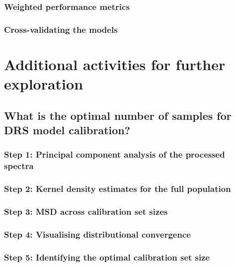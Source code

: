 \documentclass[
  10pt,
  b5paper,
  oneside]{book}
\begin{document}
\subsubsection{Weighted performance metrics}\label{weighted-performance-metrics}

\subsubsection{Cross-validating the models}\label{cross-validating-the-models}

\section{Additional activities for further exploration}\label{additional-activities-for-further-exploration}

\subsection{What is the optimal number of samples for DRS model calibration?}\label{what-is-the-optimal-number-of-samples-for-drs-model-calibration}

\subsubsection{Step 1: Principal component analysis of the processed spectra}\label{step-1-principal-component-analysis-of-the-processed-spectra}

\subsubsection{Step 2: Kernel density estimates for the full population}\label{step-2-kernel-density-estimates-for-the-full-population}

\subsubsection{Step 3: MSD across calibration set sizes}\label{step-3-msd-across-calibration-set-sizes}

\subsubsection{Step 4: Visualising distributional convergence}\label{step-4-visualising-distributional-convergence}

\subsubsection{Step 5: Identifying the optimal calibration set size}\label{step-5-identifying-the-optimal-calibration-set-size}
\end{document}
